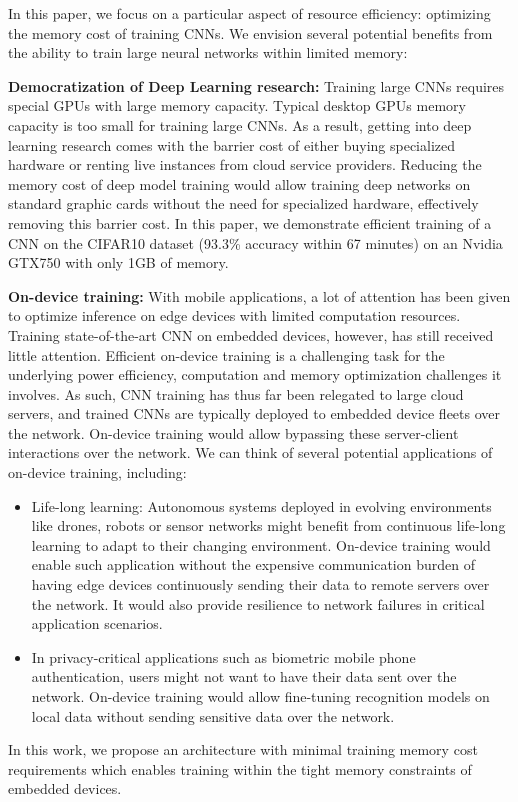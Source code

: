 \documentclass[twocolumn]{bmcart}
\begin{document}
In this paper, we focus on a particular aspect of resource efficiency: optimizing the memory cost of training CNNs.
We envision several potential benefits from the ability to train large neural networks within limited memory:

\textbf{Democratization of Deep Learning research:}
Training large CNNs requires special GPUs with large memory capacity.
Typical desktop GPUs memory capacity is too small for training large CNNs.
As a result, getting into deep learning research comes with the barrier cost of either buying specialized hardware or renting live instances from cloud service providers.
Reducing the memory cost of deep model training would allow training deep networks on standard graphic cards without the need for specialized hardware, effectively removing this barrier cost.
In this paper, we demonstrate efficient training of a CNN on the CIFAR10 dataset (93.3\% accuracy within 67 minutes) on an Nvidia GTX750 with only 1GB of memory.

\textbf{On-device training:}
With mobile applications, a lot of attention has been given to optimize inference on edge devices with limited computation resources.
Training state-of-the-art CNN on embedded devices, however, has still received little attention.
Efficient on-device training is a challenging task for the underlying power efficiency, computation and memory optimization challenges it involves.
As such, CNN training has thus far been relegated to large cloud servers, and trained CNNs are typically deployed to embedded device fleets over the network.
On-device training would allow bypassing these server-client interactions over the network.
We can think of several potential applications of on-device training, including:
\begin{itemize}
 \item Life-long learning: Autonomous systems deployed in evolving environments like drones, robots or sensor networks might benefit from continuous life-long learning to adapt to their changing environment.
On-device training would enable such application without the expensive communication burden of having edge devices continuously sending their data to remote servers over the network. It would also provide resilience to network failures in critical application scenarios.
 \item In privacy-critical applications such as biometric mobile phone authentication, users might not want to have their data sent over the network.
On-device training would allow fine-tuning recognition models on local data without sending sensitive data over the network.
\end{itemize}
In this work, we propose an architecture with minimal training memory cost requirements which enables training within the tight memory constraints of embedded devices.
\end{document}
